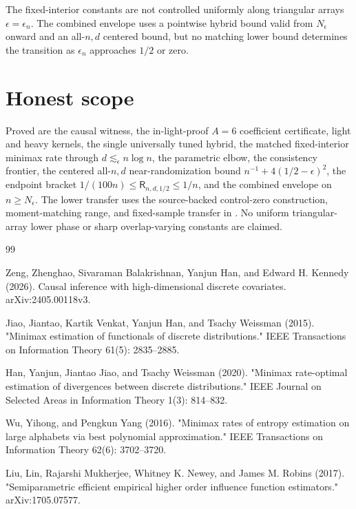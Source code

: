 \documentclass{article}
\begin{document}
The fixed-interior constants are not controlled uniformly along triangular arrays \(\epsilon=\epsilon_n\). The combined envelope uses a pointwise hybrid bound valid from \(N_\epsilon\) onward and an all-\(n,d\) centered bound, but no matching lower bound determines the transition as \(\epsilon_n\) approaches \(1/2\) or zero.

\section{Honest scope}

Proved are the causal witness, the in-light-proof \(A=6\) coefficient certificate, light and heavy kernels, the single universally tuned hybrid, the matched fixed-interior minimax rate through \(d\lesssim_\epsilon n\log n\), the parametric elbow, the consistency frontier, the centered all-\(n,d\) near-randomization bound \(n^{-1}+4(1/2-\epsilon)^2\), the endpoint bracket \(1/(100n)\le\mathsf R_{n,d,1/2}\le1/n\), and the combined envelope on \(n\ge N_\epsilon\). The lower transfer uses the source-backed control-zero construction, moment-matching range, and fixed-sample transfer in \cite{ZengBalakrishnanHanKennedy2024}. No uniform triangular-array lower phase or sharp overlap-varying constants are claimed.

\begin{thebibliography}{99}

   Zeng, Zhenghao, Sivaraman Balakrishnan, Yanjun Han, and Edward H. Kennedy (2026). Causal inference with high-dimensional discrete covariates. arXiv:2405.00118v3.

   Jiao, Jiantao, Kartik Venkat, Yanjun Han, and Tsachy Weissman (2015). "Minimax estimation of functionals of discrete distributions." IEEE Transactions on Information Theory 61(5): 2835--2885.

   Han, Yanjun, Jiantao Jiao, and Tsachy Weissman (2020). "Minimax rate-optimal estimation of divergences between discrete distributions." IEEE Journal on Selected Areas in Information Theory 1(3): 814--832.

   Wu, Yihong, and Pengkun Yang (2016). "Minimax rates of entropy estimation on large alphabets via best polynomial approximation." IEEE Transactions on Information Theory 62(6): 3702--3720.

   Liu, Lin, Rajarshi Mukherjee, Whitney K. Newey, and James M. Robins (2017). "Semiparametric efficient empirical higher order influence function estimators." arXiv:1705.07577.

\end{thebibliography}
\end{document}
